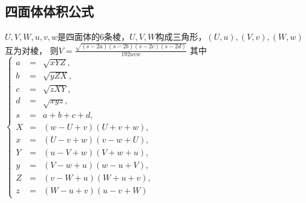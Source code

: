 	\subsection{四面体体积公式}
		$U, V, W, u, v, w$是四面体的$6$条棱，$U, V, W$构成三角形，$(U, u), (V, v), (W, w)$互为对棱，
		则$V = \frac{\sqrt{(s - 2a)(s - 2b)(s - 2c)(s - 2d)}}{192 uvw}$
		其中$\left\{\begin{array}{lll}
				a & = & \sqrt{xYZ}, \\
				b & = & \sqrt{yZX}, \\
				c & = & \sqrt{zXY}, \\
				d & = & \sqrt{xyz}, \\
				s & = & a + b + c + d, \\ 
				X & = & (w - U + v)(U + v + w), \\
				x & = & (U - v + w)(v - w + U), \\
				Y & = & (u - V + w)(V + w + u), \\
				y & = & (V - w + u)(w - u + V), \\
				Z & = & (v - W + u)(W + u + v), \\
				z & = & (W - u + v)(u - v + W)
			\end{array}\right.$
